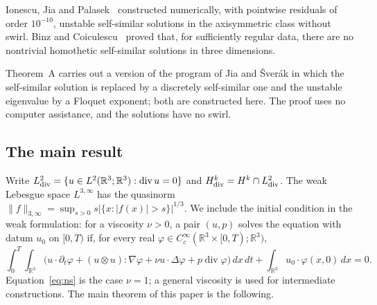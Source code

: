 \documentclass[11pt]{article}
\numberwithin{equation}{section}
\theoremstyle{definition}
\theoremstyle{remark}
\theoremstyle{plain}
\newcommand{\R}{\mathbb R}
\begin{document}
Ionescu, Jia and Palasek~\cite{ijp2026} constructed
numerically, with pointwise residuals of order $10^{-10}$, unstable
self-similar solutions in the axisymmetric class without swirl. Binz and
Coiculescu~\cite{binz-coiculescu2026} proved that, for sufficiently
regular data, there are no nontrivial homothetic self-similar solutions in
three dimensions.

Theorem~A carries out a version of the program of Jia and \v Sver\'ak in
which the self-similar solution is replaced by a discretely self-similar
one and the unstable eigenvalue by a Floquet exponent; both are
constructed here. The proof uses no computer assistance, and the solutions
have no swirl.

\subsection{The main result}
\label{sec:intro-result}

Write $L^2_{\rm div}=\{u\in L^2(\R^3;\R^3):\operatorname{div}u=0\}$ and
$H^k_{\rm div}=H^k\cap L^2_{\rm div}$. The weak Lebesgue space
$L^{3,\infty}$ has the quasinorm
$\|f\|_{3,\infty}=\sup_{s>0}s|\{x:|f(x)|>s\}|^{1/3}$.
We include the initial condition in the weak formulation: for a viscosity
$\nu>0$, a pair $(u,p)$ solves the equation with datum $u_0$ on $[0,T)$ if,
for every real $\varphi\in C_c^\infty(\R^3\times[0,T);\R^3)$,
\begin{equation}\label{eq:initial-weak-form}
 \int_0^T\!\int_{\R^3}
 \bigl(u\cdot\partial_t\varphi+(u\otimes u):\nabla\varphi
       +\nu u\cdot\Delta\varphi+p\operatorname{div}\varphi\bigr)\,dx\,dt
 +\int_{\R^3}u_0\cdot\varphi(x,0)\,dx=0.
\end{equation}
Equation~\eqref{eq:ns} is the case $\nu=1$; a general viscosity is used
for intermediate constructions.
The main theorem of this paper is the following.
\end{document}
